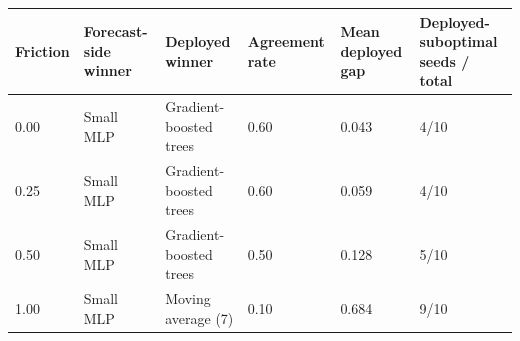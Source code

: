 \begin{tabular}{llllll}
\toprule
Friction & Forecast-side winner & Deployed winner & Agreement rate & Mean deployed gap & Deployed-suboptimal seeds / total \\
\midrule
0.00 & Small MLP & Gradient-boosted trees & 0.60 & 0.043 & 4/10 \\
0.25 & Small MLP & Gradient-boosted trees & 0.60 & 0.059 & 4/10 \\
0.50 & Small MLP & Gradient-boosted trees & 0.50 & 0.128 & 5/10 \\
1.00 & Small MLP & Moving average (7) & 0.10 & 0.684 & 9/10 \\
\bottomrule
\end{tabular}
